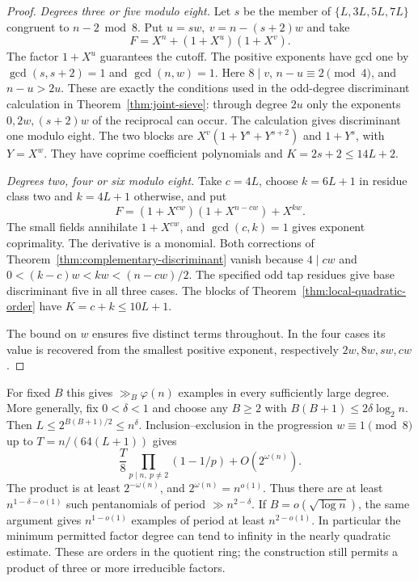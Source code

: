 \documentclass[11pt]{article}
\begin{document}
\begin{proof}
\emph{Degrees three or five modulo eight.} Let \(s\) be the member
of \(\{L,3L,5L,7L\}\) congruent to \(n-2\bmod8\). Put
\(u=sw,\ v=n-(s+2)w\) and take
\[
                  F=X^n+(1+X^u)(1+X^v).
\]
The factor \(1+X^u\) guarantees the cutoff. The positive exponents
have gcd one by \(\gcd(s,s+2)=1\) and \(\gcd(n,w)=1\).
Here \(8\mid v\), \(n-u\equiv2\pmod4\), and \(n-u>2u\).
These are exactly the conditions used in the odd-degree discriminant
calculation in Theorem~\ref{thm:joint-sieve}: through degree \(2u\)
only the exponents \(0,2w,(s+2)w\) of the reciprocal can occur.
The calculation gives discriminant one modulo eight. The two blocks
are \(X^v(1+Y^s+Y^{s+2})\) and \(1+Y^s\), with \(Y=X^w\).
They have coprime coefficient polynomials and \(K=2s+2\le14L+2\).

\emph{Degrees two, four or six modulo eight.} Take \(c=4L\),
choose \(k=6L+1\) in residue class two and \(k=4L+1\) otherwise,
and put
\[
                F=(1+X^{cw})(1+X^{n-cw})+X^{kw}.
\]
The small fields annihilate \(1+X^{cw}\), and \(\gcd(c,k)=1\)
gives exponent coprimality. The derivative is a monomial.
Both corrections of Theorem~\ref{thm:complementary-discriminant}
vanish because \(4\mid cw\) and
\(0<(k-c)w<kw<(n-cw)/2\). The specified odd tap residues
give base discriminant five in all three cases.
The blocks of Theorem~\ref{thm:local-quadratic-order} have
\(K=c+k\le10L+1\).

The bound on \(w\) ensures five distinct terms throughout.
In the four cases its value is recovered from the smallest
positive exponent, respectively \(2w,8w,sw,cw\).
\end{proof}

For fixed \(B\) this gives \(\gg_B\varphi(n)\) examples
in every sufficiently large degree. More generally, fix
\(0<\delta<1\) and choose any \(B\ge2\) with
\(B(B+1)\le2\delta\log_2 n\). Then \(L\le 2^{B(B+1)/2}\le n^\delta\).
Inclusion--exclusion in the progression \(w\equiv1\pmod8\) up
to \(T=n/(64(L+1))\) gives
\[
       \frac{T}{8}\prod_{p\mid n,\ p\ne2}(1-1/p)+O(2^{\omega(n)}).
\]
The product is at least \(2^{-\omega(n)}\), and
\(2^{\omega(n)}=n^{o(1)}\). Thus there are at least
\(n^{1-\delta-o(1)}\) such pentanomials of period
\(\gg n^{2-\delta}\). If \(B=o(\sqrt{\log n})\), the same argument
gives \(n^{1-o(1)}\) examples of period at least \(n^{2-o(1)}\).
In particular the minimum permitted factor degree can tend to infinity
in the nearly quadratic estimate. These are orders in the quotient
ring; the construction still permits a product of three or more
irreducible factors.
\end{document}
